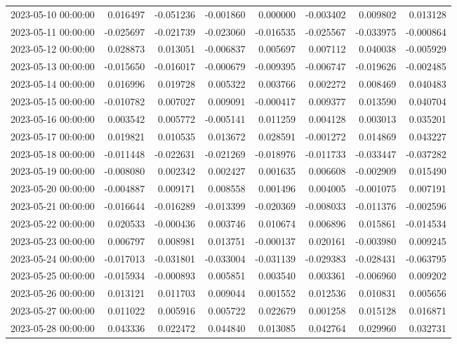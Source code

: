 \begin{tabular}{lrrrrrrr}
2023-05-10 00:00:00 & 0.016497 & -0.051236 & -0.001860 & 0.000000 & -0.003402 & 0.009802 & 0.013128 \\
2023-05-11 00:00:00 & -0.025697 & -0.021739 & -0.023060 & -0.016535 & -0.025567 & -0.033975 & -0.000864 \\
2023-05-12 00:00:00 & 0.028873 & 0.013051 & -0.006837 & 0.005697 & 0.007112 & 0.040038 & -0.005929 \\
2023-05-13 00:00:00 & -0.015650 & -0.016017 & -0.000679 & -0.009395 & -0.006747 & -0.019626 & -0.002485 \\
2023-05-14 00:00:00 & 0.016996 & 0.019728 & 0.005322 & 0.003766 & 0.002272 & 0.008469 & 0.040483 \\
2023-05-15 00:00:00 & -0.010782 & 0.007027 & 0.009091 & -0.000417 & 0.009377 & 0.013590 & 0.040704 \\
2023-05-16 00:00:00 & 0.003542 & 0.005772 & -0.005141 & 0.011259 & 0.004128 & 0.003013 & 0.035201 \\
2023-05-17 00:00:00 & 0.019821 & 0.010535 & 0.013672 & 0.028591 & -0.001272 & 0.014869 & 0.043227 \\
2023-05-18 00:00:00 & -0.011448 & -0.022631 & -0.021269 & -0.018976 & -0.011733 & -0.033447 & -0.037282 \\
2023-05-19 00:00:00 & -0.008080 & 0.002342 & 0.002427 & 0.001635 & 0.006608 & -0.002909 & 0.015490 \\
2023-05-20 00:00:00 & -0.004887 & 0.009171 & 0.008558 & 0.001496 & 0.004005 & -0.001075 & 0.007191 \\
2023-05-21 00:00:00 & -0.016644 & -0.016289 & -0.013399 & -0.020369 & -0.008033 & -0.011376 & -0.002596 \\
2023-05-22 00:00:00 & 0.020533 & -0.000436 & 0.003746 & 0.010674 & 0.006896 & 0.015861 & -0.014534 \\
2023-05-23 00:00:00 & 0.006797 & 0.008981 & 0.013751 & -0.000137 & 0.020161 & -0.003980 & 0.009245 \\
2023-05-24 00:00:00 & -0.017013 & -0.031801 & -0.033004 & -0.031139 & -0.029383 & -0.028431 & -0.063795 \\
2023-05-25 00:00:00 & -0.015934 & -0.000893 & 0.005851 & 0.003540 & 0.003361 & -0.006960 & 0.009202 \\
2023-05-26 00:00:00 & 0.013121 & 0.011703 & 0.009044 & 0.001552 & 0.012536 & 0.010831 & 0.005656 \\
2023-05-27 00:00:00 & 0.011022 & 0.005916 & 0.005722 & 0.022679 & 0.001258 & 0.015128 & 0.016871 \\
2023-05-28 00:00:00 & 0.043336 & 0.022472 & 0.044840 & 0.013085 & 0.042764 & 0.029960 & 0.032731 \\

\end{tabular}
